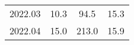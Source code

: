 \begin{table}[htb]
\begin{adjustwidth}{-0.05\textwidth}{-0.05\textwidth}
\begin{center}
{\begin{tabular}{cccc}
          2022.03 & 10.3                                                                       & 94.5                                                                 & 15.3                                                                                              \\
          2022.04 & 15.0                                                                       & 213.0                                                                & 15.9                                                                                              \\ \hline
          \end{tabular}
      }
    \end{center}
  \end{adjustwidth}
\end{table}